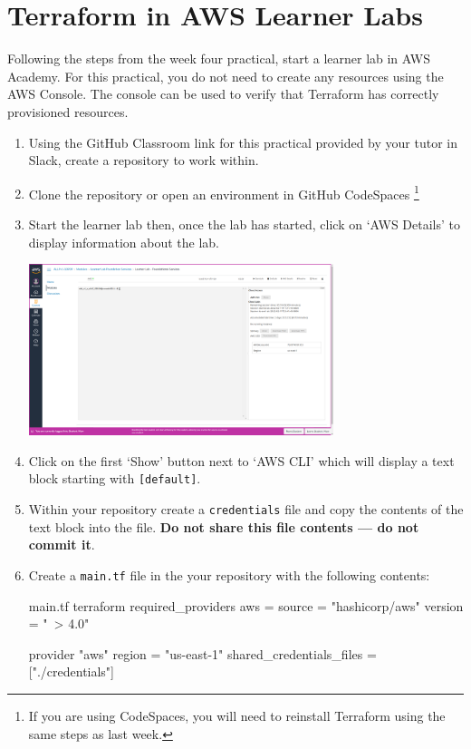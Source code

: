 \documentclass{csse4400}
\begin{document}
\section{Terraform in AWS Learner Labs}
Following the steps from the week four practical,
start a learner lab in AWS Academy.
For this practical,
you do not need to create any resources using the AWS Console.
The console can be used to verify that Terraform has correctly provisioned resources.

\begin{enumerate}
\item Using the GitHub Classroom link for this practical provided by your tutor in Slack,
    create a repository to work within.
\item Clone the repository or open an environment in GitHub CodeSpaces%
\footnote{If you are using CodeSpaces, you will need to reinstall Terraform using the same steps as last week.}
\item Start the learner lab then, once the lab has started,
    click on `AWS Details' to display information about the lab.

\includegraphics[width=0.7\textwidth]{images/aws-details}

\item Click on the first `Show' button next to `AWS CLI' which will display a text block starting with \texttt{[default]}.
\item Within your repository create a \texttt{credentials} file and copy the contents of the text block into the file.
\textbf{Do not share this file contents --- do not commit it}.
\item Create a \texttt{main.tf} file in the your repository with the following contents:
\begin{code}[language=terraform,numbers=none]{main.tf}
terraform {
    required_providers {
        aws = {
            source  = "hashicorp/aws"
            version = "~> 4.0"
        }
    }
}

provider "aws" {
    region = "us-east-1"
    shared_credentials_files = ["./credentials"]
}
\end{code}


\end{enumerate}
\end{document}
